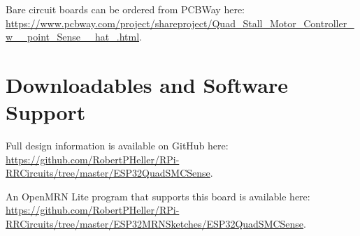 Bare circuit boards can be ordered from PCBWay here: 
\url{https://www.pcbway.com/project/shareproject/Quad_Stall_Motor_Controller_w__point_Sense__hat_.html}.

\section{Downloadables and Software Support}

Full design information is available on GitHub here:
\url{https://github.com/RobertPHeller/RPi-RRCircuits/tree/master/ESP32QuadSMCSense}.

An OpenMRN Lite program that supports this board is available here:
\url{https://github.com/RobertPHeller/RPi-RRCircuits/tree/master/ESP32MRNSketches/ESP32QuadSMCSense}.



